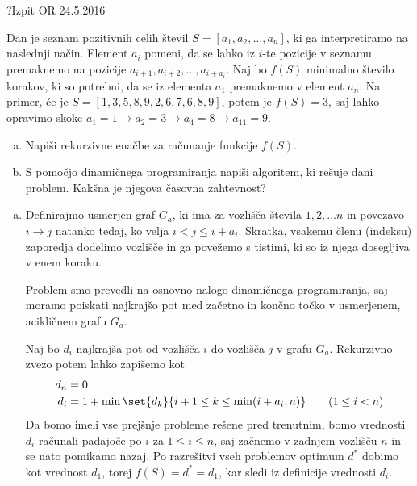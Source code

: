 \begin{naloga}{?}{Izpit OR 24.5.2016}
\begin{vprasanje}
Dan je seznam pozitivnih celih števil $S = [a_1, a_2, \dots, a_n]$,
ki ga interpretiramo na naslednji način.
Element $a_i$ pomeni,
da se lahko iz $i$-te pozicije v seznamu
premaknemo na pozicije $a_{i+1}, a_{i+2}, \dots, a_{i+a_i}$.
Naj bo $f(S)$ minimalno število korakov,
ki so potrebni, da se iz elementa $a_1$ premaknemo v element $a_n$.
Na primer, če je $S = [1, 3, 5, 8, 9, 2, 6, 7, 6, 8, 9]$,
potem je $f(S) = 3$,
saj lahko opravimo skoke $a_1 = 1 \to a_2 = 3 \to a_4 = 8 \to a_{11} = 9$.

\begin{enumerate}[(a)]
\item Napiši rekurzivne enačbe za računanje funkcije $f(S)$.

\item S pomočjo dinamičnega programiranja napiši algoritem,
ki rešuje dani problem.
Kakšna je njegova časovna zahtevnost?
\end{enumerate}
\end{vprasanje}
\begin{odgovor}

\begin{enumerate}[(a)]

\item Definirajmo usmerjen graf $G_a$,
ki ima za vozlišča števila $1, 2, \dots n$
in povezavo $i \rightarrow j$ natanko tedaj, ko velja $i < j \leq i + a_i$.
Skratka, vsakemu členu (indeksu) zaporedja dodelimo vozlišče
in ga povežemo s tistimi, ki so iz njega dosegljiva v enem koraku.

Problem smo prevedli na osnovno nalogo dinamičnega programiranja, saj moramo poiskati najkrajšo pot med začetno in končno točko v 
usmerjenem, acikličnem grafu $G_a$.

Naj bo $d_i$ najkrajša pot od vozlišča $i$ do vozlišča $j$ v grafu $G_a$. 
Rekurzivno zvezo potem lahko zapišemo kot
\begin{align*}
d_n &= 0 \\
d_i &= 1 + \min\set{d_k}{i+1 \le k \le \min(i+a_i, n)}
\qquad (1 \le i < n)
\end{align*}
Da bomo imeli vse prejšnje probleme rešene pred trenutnim, bomo vrednosti $d_i$ računali padajoče po $i$ za $1 \leq i \leq n$, 
saj začnemo v zadnjem vozlišču $n$ in se nato pomikamo nazaj.
Po razrešitvi vseh problemov optimum $d^*$ dobimo kot vrednost $d_1$,
torej $f(S) = d^* = d_1$, kar sledi iz definicije vrednosti $d_i$.


\end{enumerate}
\end{odgovor}
\end{naloga}
